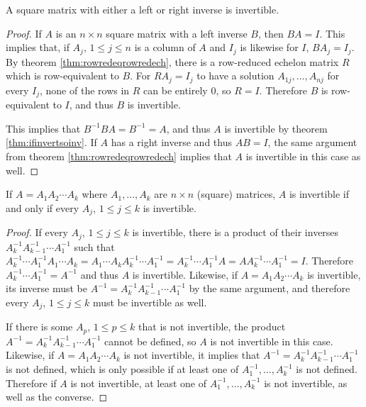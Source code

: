 \documentclass[12pt]{article}
\begin{document}
\begin{cor}
  A square matrix with either a left or right inverse is
  invertible.

  \begin{proof}
    If $A$ is an $n \times n$ square matrix with a left inverse
    $B$, then $BA = I$. This implies that, if $A_j$, $1 \leq j
    \leq n$ is a column of $A$ and $I_j$ is likewise for $I$,
    $BA_j = I_j$. By theorem \ref{thm:rowredeqrowredech}, there
    is a row-reduced echelon matrix $R$ which is row-equivalent
    to $B$. For $RA_j = I_j$ to have a solution
    $A_{1j},\ldots,A_{nj}$ for every $I_j$, none of the rows in
    $R$ can be entirely $0$, so $R = I$. Therefore $B$ is
    row-equivalent to $I$, and thus $B$ is invertible.

    This implies that $B^{-1}BA = B^{-1} = A$, and thus $A$ is
    invertible by theorem \ref{thm:ifinvertsoinv}. If $A$ has a
    right inverse and thus $AB = I$, the same argument from
    theorem \ref{thm:rowredeqrowredech} implies that $A$ is
    invertible in this case as well.
  \end{proof}
\end{cor}

\begin{cor}
  If $A = A_{1}A_{2}\cdots A_{k}$ where $A_{1},\ldots,A_{k}$ are
  $n \times n$ (square) matrices, $A$ is invertible if and only
  if every $A_j$, $1 \leq j \leq k$ is invertible.

  \begin{proof}
    If every $A_j$, $1 \leq j \leq k$ is invertible, there is a
    product of their inverses $A_{k}^{-1}A_{k-1}^{-1}\cdots
    A_{1}^{-1}$ such that $A_{k}^{-1}\cdots A_{1}^{-1}A_{1}\cdots
    A_{k} = A_{1}\cdots A_{k}A_{k}^{-1}\cdots A_{1}^{-1} =
    A_{k}^{-1}\cdots A_{1}^{-1}A = AA_{k}^{-1}\cdots A_{1}^{-1} =
    I$. Therefore $A_{k}^{-1}\cdots A_{1}^{-1} = A^{-1}$ and thus
    $A$ is invertible. Likewise, if $A = A_{1}A_{2}\cdots A_{k}$
    is invertible, its inverse must be $A^{-1} =
    A_{k}^{-1}A_{k-1}^{-1}\cdots A_{1}^{-1}$ by the same
    argument, and therefore every $A_j$, $1 \leq j \leq k$ must
    be invertible as well.

    If there is some $A_p$, $1 \leq p \leq k$ that is not
    invertible, the product $A^{-1} =
    A_{k}^{-1}A_{k-1}^{-1}\cdots A_{1}^{-1}$ cannot be defined,
    so $A$ is not invertible in this case. Likewise, if $A =
    A_{1}A_{2}\cdots A_{k}$ is not invertible, it implies that
    $A^{-1} = A_{k}^{-1}A_{k-1}^{-1}\cdots A_{1}^{-1}$ is not
    defined, which is only possible if at least one of
    $A_{1}^{-1},\ldots,A_k^{-1}$ is not defined. Therefore if $A$
    is not invertible, at least one of
    $A_{1}^{-1},\ldots,A_k^{-1}$ is not invertible, as well as
    the converse.
  \end{proof}
\end{cor}
\end{document}
